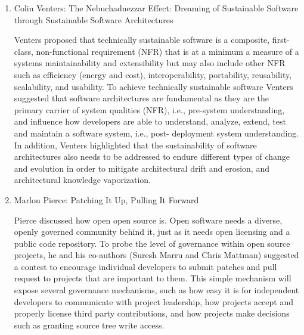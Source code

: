 \documentclass[11pt, oneside]{amsart}
\begin{document}
\begin{enumerate}

\item Colin Venters: The Nebuchadnezzar Effect: Dreaming of Sustainable Software
through Sustainable Software Architectures

Venters proposed that technically sustainable software is a composite, first-class, 
non-functional requirement (NFR) that is at a minimum a measure of a systems 
maintainability and extensibility but may also include other NFR such as efficiency 
(energy and cost), interoperability, portability, reusability, scalability, and usability. To 
achieve technically sustainable software Venters suggested that software 
architectures are fundamental as they are the primary carrier of system qualities 
(NFR), i.e., pre-system understanding, and influence how developers are able to 
understand, analyze, extend, test and maintain a software system, i.e., post-
deployment system understanding. In addition, Venters highlighted that the 
sustainability of software architectures also needs to be addressed to endure 
different types of change and evolution in order to mitigate architectural drift and 
erosion, and architectural knowledge vaporization.



\item Marlon Pierce: Patching It Up, Pulling It Forward

Pierce discussed how open open source is. Open software needs a diverse, openly governed
community behind it, just as it needs open licensing and a public code
repository. To probe the level of governance within open source projects, he and
his co-authors (Suresh Marru and Chris Mattman)
suggested a contest to encourage individual developers to submit patches and pull
request to projects that are important to them. This simple mechanism will
expose several governance mechanisms, such as how easy it is for independent
developers to communicate with project leadership, how projects accept and
properly license third party contributions, and how projects make decisions such
as granting source tree write access.



\end{enumerate}
\end{document}
